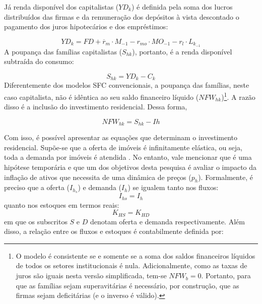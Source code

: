 Já renda disponível dos capitalistas ($YD_k$) é definida pela soma dos lucros distribuídos das firmas e da remuneração dos depósitos à vista descontado o pagamento dos juros hipotecários e dos empréstimos:

\begin{equation}
    \label{EqYD}
    YD_k = FD + \overline r_m\cdot M_{-1} - r_{mo}\cdot MO_{-1} - r_{l}\cdot L_{k_{-1}}
\end{equation}
A poupança das famílias capitalistas ($S_{hk}$), portanto, é a renda disponível subtraída do consumo:

\begin{equation}
    \label{EqSh}
    S_{hk} = YD_k - C_k
\end{equation}
Diferentemente dos modelos SFC convencionais, a poupança das famílias, neste caso capitalista,  não é idêntica ao seu saldo financeiro líquido ($NFW_{hk}$)\footnote{O modelo é consistente se e somente se a soma dos saldos financeiros líquidos de todos os setores institucionais é nula. Adicionalmente, como as taxas de juros são iguais nesta versão simplificada, tem-se $NFW_b = 0$. Portanto, para que as famílias sejam superavitárias é necessário, por construção, que as firmas sejam deficitárias (e o inverso é válido).
}. A razão disso é a inclusão do investimento residencial. Dessa forma, 

\begin{equation}
\label{NFWh}
    NFW_{hk} = S_{hk} - Ih
\end{equation}

Com isso, é possível apresentar as equações que determinam o investimento residencial. Supõe-se que a oferta de imóveis é infinitamente elástica, ou seja, toda a demanda por imóveis é atendida \cite[p.~141--145]{duesenberry_investment_1958}. No entanto, vale mencionar que é uma hipótese temporária e que um dos objetivos desta pesquisa é avaliar o impacto da inflação de ativos que necessita de uma dinâmica de preços ($p_h$). Formalmente, é preciso que a oferta ($I_{h_s}$) e demanda ($I_h$) se igualem tanto nos fluxos:
\begin{equation}
    I_{hs} = I_h
\end{equation}
quanto nos estoques em termos reais:
\begin{equation}
    K_{HS} = K_{HD}
\end{equation}
em que os subscritos $S$ e $D$ denotam oferta e demanda respectivamente. Além disso, a relação entre os fluxos e estoques é contabilmente definida por:

